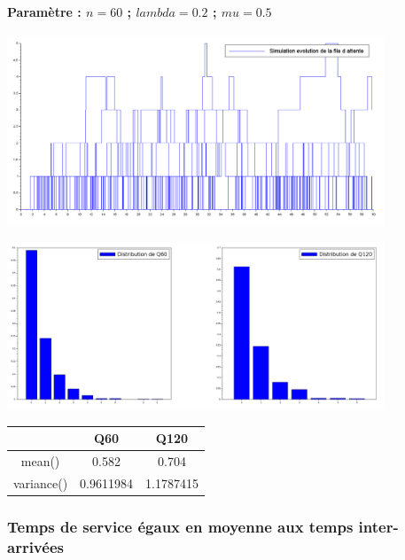 \documentclass{article}
\begin{document}
\paragraph{Paramètre : $n=60$ ; $lambda=0.2$ ; $mu=0.5$}
\begin{center}
	\includegraphics[width=425px]{img/sup.PNG}
\end{center}
\begin{center}
	\includegraphics[width=425px]{img/inf/dist.png}
\end{center}
\begin{center}
	\begin{tabular}{c||c||c}
		& Q60 & Q120 \\
		\hline \hline
		mean() & 0.582 & 0.704 \\
		\hline \hline
		variance() & 0.9611984 & 1.1787415 \\
	\end{tabular}
\end{center}

\subsubsection{Temps de service égaux en moyenne aux temps inter-arrivées}
\end{document}
